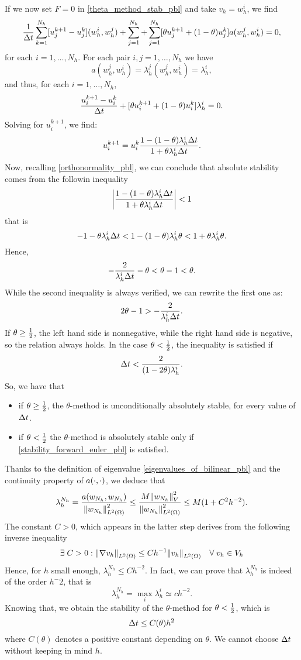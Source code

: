 If we now set \(F=0\) in \eqref{theta_method_stab_pbl} and take \(v_h = w_h^i\), we find 
\[
    \frac{1}{\Delta t} \sum_{k=1}^{N_h} [u_j^{k+1} - u_j^k](w_h^i, w_h^j) + \sum_{j=1}^{N_h} + \sum_{j=1}^{N_h}[\theta u_j^{k+1} + (1-\theta)u_j^k]a(w_h^j, w_h^i) = 0,
\]
for each \(i = 1,\ldots, N_h\). For each pair \(i,j = 1, \ldots, N_h\) we have 
\[
    a(w_h^j, w_h^i) = \lambda^j_h (w_h^j, w_h^i) = \lambda^i_h,
\]
and thus, for each \(i = 1,\ldots, N_h\), 
\[
    \frac{u_i^{k+1} - u^k_i}{\Delta t} + [\theta u^{k+1}_i + (1-\theta)u^k_i] \lambda_h^i = 0.
\]
Solving for \(u^{k+1}_i\), we find:
\[
    u_i^{k+1} = u_i^k \frac{1-(1-\theta) \lambda_h^i \Delta t}{1+\theta \lambda_h^i\Delta t}.
\]
Now, recalling \eqref{orthonormality_pbl}, we can conclude that absolute stability comes from the followin inequality
\[
    \abs{\frac{1-(1-\theta) \lambda_h^i \Delta t}{1+\theta \lambda_h^i\Delta t}} < 1
\]
that is 
\[
    -1-\theta \lambda_h^i \Delta t < 1 - (1-\theta) \lambda_h^i \theta < 1+\theta \lambda_h^i \theta.
\]
Hence, 
\[
    -\frac{2}{\lambda_h^i \Delta t} -\theta < \theta -1 < \theta.
\]
While the second inequality is always verified, we can rewrite the first one as: 
\[
    2\theta - 1 > -\frac{2}{\lambda_h^i \Delta t}. 
\]
If \(\theta \geq \frac{1}{2}\), the left hand side is nonnegative, while the right hand side is negative, so the relation always holds. In the case \(\theta < \frac{1}{2}\), the inequality is satisfied if 
\begin{equation}
    \Delta t < \frac{2}{(1-2\theta) \lambda_h^i}.
    \label{stability_forward_euler_pbl}
\end{equation}
So, we have that 
\begin{itemize}
    \item if \(\theta \geq \frac{1}{2}\), the \(\theta\)-method is unconditionally absolutely stable, for every value of \(\Delta t\).
    \item if \(\theta < \frac{1}{2}\) the \(\theta\)-method is absolutely stable only if \eqref{stability_forward_euler_pbl} is satisfied.
\end{itemize}
Thanks to the definition of eigenvalue \eqref{eigenvalues_of_bilinear_pbl} and the continuity property of \(a(\cdot, \cdot)\), we deduce that 
\[
    \lambda_h^{N_h} = \frac{a(w_{N_h}, w_{N_h})}{\norm{w_{N_h}}_{L^2(\Omega)}^2} \leq \frac{M\norm{w_{N_h}}_V^2}{\norm{w_{N_h}}_{L^2(\Omega)}^2} \leq M(1+C^2h^{-2}).
\]
The constant \(C > 0\), which appears in the latter step derives from the following inverse inequality 
\[
    \exists \; C > 0 : \norm{\nabla v_h}_{L^2(\Omega)} \leq Ch^{-1} \norm{v_h}_{L^2(\Omega)} \quad \forall \; v_h \in V_h
\]
Hence, for \(h\) small enough, \(\lambda_h^{N_h} \leq Ch^{-2}\). In fact, we can prove that \(\lambda^{N_h}_h\) is indeed of the order \(h^-2\), that is \
\[
    \lambda_h^{N_h} = \max_i \lambda_h^i \simeq ch^{-2}. 
\]
Knowing that, we obtain the stability of the \(\theta\)-method for \(\theta < \frac{1}{2}\), which is 
\begin{equation}
    \Delta t \leq C(\theta) h^2
    \label{forward_euler_stab_pbl}
\end{equation}
where \(C(\theta)\) denotes a positive constant depending on \(\theta\). We cannot choose \(\Delta t\) without keeping in mind \(h\).


